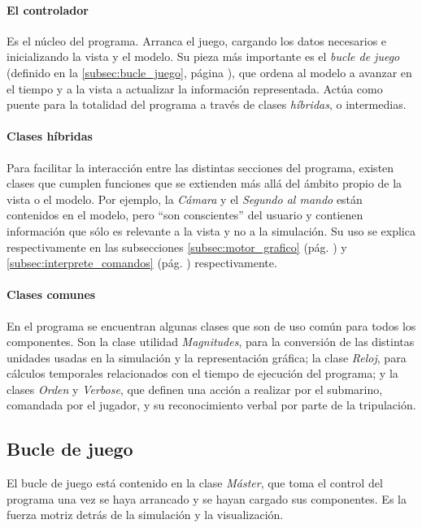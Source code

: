 \documentclass[a4paper,
	11pt,
	parskip=full,
	bibliography=totoc,
	twoside
	]{scrartcl}
\begin{document}
		\paragraph{El controlador}
			Es el núcleo del programa. Arranca el juego, cargando los datos necesarios e inicializando la vista y el modelo. Su pieza más importante es el \textit{bucle de juego} (definido en la \autoref{subsec:bucle_juego}, página \pageref{subsec:bucle_juego}), que ordena al modelo a avanzar en el tiempo y a la vista a actualizar la información representada. Actúa como puente para la totalidad del programa a través de clases \textit{híbridas}, o intermedias.
			
		\paragraph{Clases híbridas}
			Para facilitar la interacción entre las distintas secciones del programa, existen clases que cumplen funciones que se extienden más allá del ámbito propio de la vista o el modelo. Por ejemplo, la \textit{Cámara} y el \textit{Segundo al mando} están contenidos en el modelo, pero ``son conscientes'' del usuario y contienen información que sólo es relevante a la vista y no a la simulación.  Su uso se explica respectivamente en las subsecciones \ref{subsec:motor_grafico}  (pág. \pageref{subsec:motor_grafico}) y \ref{subsec:interprete_comandos}  (pág. \pageref{subsec:interprete_comandos}) respectivamente.
			
		\paragraph{Clases comunes}
			En el programa se encuentran algunas clases que son de uso común para todos los componentes. Son la clase utilidad \textit{Magnitudes}, para la conversión de las distintas unidades usadas en la simulación y la representación gráfica; la clase \textit{Reloj}, para cálculos temporales relacionados con el tiempo de ejecución del programa; y la clases \textit{Orden} y \textit{Verbose}, que definen una acción a realizar por el submarino, comandada por el jugador, y su reconocimiento verbal por parte de la tripulación.
			
	\subsection{Bucle de juego}
	\label{subsec:bucle_juego}
		El bucle de juego está contenido en la clase \textit{Máster}, que toma el control del programa una vez se haya arrancado y se hayan cargado sus componentes. Es la fuerza motriz detrás de la simulación y la visualización.
		
\end{document}
